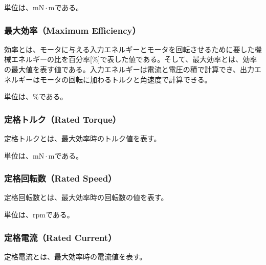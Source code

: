 単位は、$\mathrm{mN \cdot m}$である。
\subsubsection{最大効率（Maximum Efficiency）}\label{sub:sub:saidaikouritu}
効率とは、モータに与える入力エネルギーとモータを回転させるために要した機械エネルギーの比を百分率[\%]で表した値である。そして、最大効率とは、効率の最大値を表す値である。入力エネルギーは電流と電圧の積で計算でき、出力エネルギーはモータの回転に加わるトルクと角速度で計算できる。

単位は、$\mathrm{\%}$である。
\subsubsection{定格トルク（Rated Torque）}\label{sub:sub:teikakutoruku}
定格トルクとは、最大効率時のトルク値を表す。

単位は、$\mathrm{mN \cdot m}$である。
\subsubsection{定格回転数（Rated Speed）}\label{sub:sub:teikakukaiten}
定格回転数とは、最大効率時の回転数の値を表す。

単位は、$\mathrm{rpm}$である。

\subsubsection{定格電流（Rated Current）}\label{sub:sub:teikakuden}
定格電流とは、最大効率時の電流値を表す。

